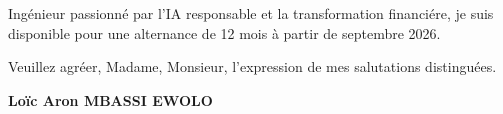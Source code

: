 \documentclass[a4paper,11pt]{article}
\begin{document}
\vspace{0.8em}

Ing\'enieur passionn\'e par l'IA responsable et la transformation financi\'ere, je suis disponible pour une alternance de 12 mois \`a partir de septembre 2026.

\vspace{1.5em}
\noindent Veuillez agr\'eer, Madame, Monsieur, l'expression de mes salutations distingu\'ees.

\vspace{2em}
\noindent \textbf{Lo\"ic Aron MBASSI EWOLO}
\end{document}
